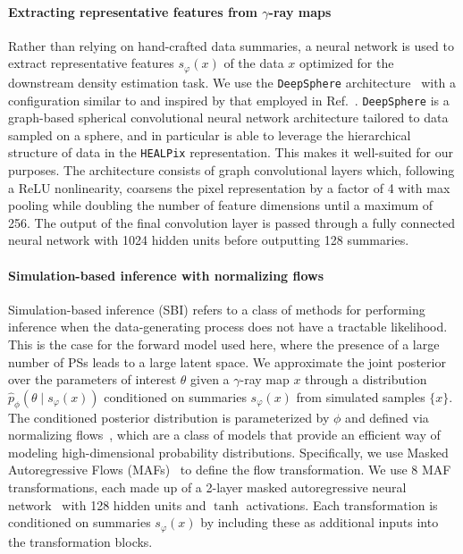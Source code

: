\documentclass[]{article}
\begin{document}
\paragraph{Extracting representative features from $\gamma$-ray maps} Rather than relying on hand-crafted data summaries, a neural network is used to extract representative features $s_\varphi(x)$ of the data $x$ optimized for the downstream density estimation task. We use the \texttt{DeepSphere} architecture~\cite{defferrard2020deepsphere,Perraudin:2018rbt,deepsphere_rlgm} with a configuration similar to and inspired by that employed in Ref.~\cite{List:2020mzd}. \texttt{DeepSphere} is a graph-based spherical convolutional neural network architecture tailored to data sampled on a sphere, and in particular is able to leverage the hierarchical structure of data in the \texttt{HEALPix} representation. This makes it well-suited for our purposes. The architecture consists of graph convolutional layers which, following a ReLU nonlinearity, coarsens the pixel representation by a factor of 4 with max pooling while doubling the number of feature dimensions until a maximum of 256. The output of the final convolution layer is passed through a fully connected neural network with 1024 hidden units before outputting 128 summaries.

\paragraph{Simulation-based inference with normalizing flows} Simulation-based inference (SBI) refers to a class of methods for performing inference when the data-generating process does not have a tractable likelihood. This is the case for the forward model used here, where the presence of a large number of PSs leads to a large latent space. We approximate the joint posterior over the parameters of interest $\theta$ given a $\gamma$-ray map $x$ through a distribution $\hat p_\phi(\theta\mid s_\varphi(x))$ conditioned on summaries $s_\varphi(x)$ from simulated samples $\{x\}$. The conditioned posterior distribution is parameterized by $\phi$ and defined via normalizing flows~\cite{papamakarios2019normalizing,DBLP:conf/icml/RezendeM15}, which are a class of models that provide an efficient way of modeling high-dimensional probability distributions. Specifically, we use Masked Autoregressive Flows (MAFs)~\cite{10.5555/3294771.3294994} to define the flow transformation. We use 8 MAF transformations, each made up of a 2-layer masked autoregressive neural network~\cite{germain2015made} with 128 hidden units and $\tanh$ activations. 
Each transformation is conditioned on summaries $s_\varphi(x)$ by including these as additional inputs into the transformation blocks.
\end{document}
